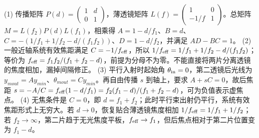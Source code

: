(1) 传播矩阵 \(P(d)=\begin{pmatrix}1&d\\0&1\end{pmatrix}\)，薄透镜矩阵 \(L(f)=\begin{pmatrix}1&0\\-1/f&1\end{pmatrix}\)。总矩阵 \(M=L(f_2)P(d)L(f_1)\)，相乘得 \(A=1-d/f_1\)、\(B=d\)、\(C=-(1/f_1+1/f_2-d/(f_1f_2))\)、\(D=1-d/f_2\)，并满足 \(AD-BC=1\)。
(2) 一般近轴系统有效焦距满足 \(C=-1/f_{\rm eff}\)，所以 \(1/f_{\rm eff}=1/f_1+1/f_2-d/(f_1f_2)\)；等价为 \(f_{\rm eff}=f_1f_2/(f_1+f_2-d)\)，前提为分母不为零。不能直接将两片分离透镜的焦度相加，漏掉间隔修正。
(3) 平行入射时起始角 \(\theta_{\rm in}=0\)，第二透镜后光线为 \(y_{
m out}=Ay_{
m in}\)、\(\theta_{
m out}=Cy_{
m in}\)。再自由传播 \(s\) 到轴上，要求 \(A+sC=0\)，故后焦距 \(s=-A/C=f_{\rm eff}(1-d/f_1)=f_2(f_1-d)/(f_1+f_2-d)\)，可为负值表示虚焦点。
(4) 无焦条件是 \(C=0\)，即 \(d=f_1+f_2\)；此时平行束出射仍平行，系统有效焦距形式上无穷大。若 \(d\to0\)，恢复贴合薄透镜焦度相加 \(1/f_{\rm eff}=1/f_1+1/f_2\)；若 \(f_2\to\infty\)，第二片趋于无光焦度平板，\(f_{\rm eff}\to f_1\)，但后焦点相对于第二片位置变为 \(f_1-d\)。
